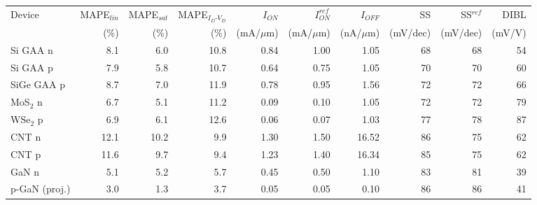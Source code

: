 \begin{tabular}{lrrrrrrrrr}
\hline
Device & MAPE$_{lin}$ & MAPE$_{sat}$ & MAPE$_{I_D\text{-}V_D}$ & $I_{ON}$ & $I_{ON}^{ref}$ & $I_{OFF}$ & SS & SS$^{ref}$ & DIBL \\
 & (\%) & (\%) & (\%) & (mA/$\mu$m) & (mA/$\mu$m) & (nA/$\mu$m) & (mV/dec) & (mV/dec) & (mV/V) \\
\hline
Si GAA n & 8.1 & 6.0 & 10.8 & 0.84 & 1.00 & 1.05 & 68 & 68 & 54 \\
Si GAA p & 7.9 & 5.8 & 10.7 & 0.64 & 0.75 & 1.05 & 70 & 70 & 60 \\
SiGe GAA p & 8.7 & 7.0 & 11.9 & 0.78 & 0.95 & 1.56 & 72 & 72 & 66 \\
MoS$_2$ n & 6.7 & 5.1 & 11.2 & 0.09 & 0.10 & 1.05 & 72 & 72 & 79 \\
WSe$_2$ p & 6.9 & 6.1 & 12.6 & 0.06 & 0.07 & 1.03 & 77 & 78 & 87 \\
CNT n & 12.1 & 10.2 & 9.9 & 1.30 & 1.50 & 16.52 & 86 & 75 & 62 \\
CNT p & 11.6 & 9.7 & 9.4 & 1.23 & 1.40 & 16.34 & 85 & 75 & 62 \\
GaN n & 5.1 & 5.2 & 5.7 & 0.45 & 0.50 & 1.10 & 83 & 81 & 39 \\
p-GaN (proj.) & 3.0 & 1.3 & 3.7 & 0.05 & 0.05 & 0.10 & 86 & 86 & 41 \\
\hline
\end{tabular}
